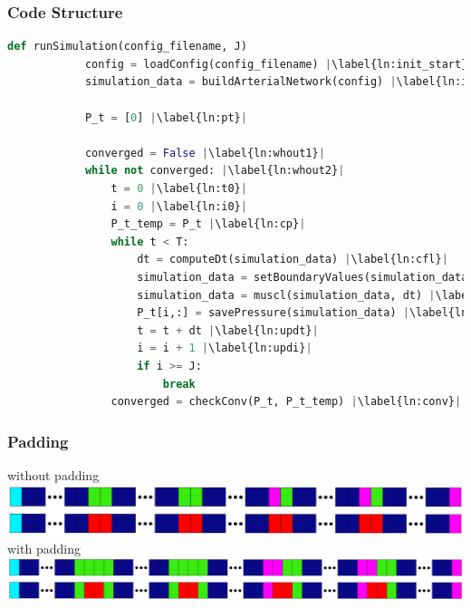 \documentclass{beamer}
\begin{document}
\begin{frame} [fragile]
	\frametitle{Code Structure}
	\begin{lstlisting}[basicstyle=\fontsize{8}{8}\selectfont\ttfamily, language=Python, caption=The code structure of an entire simulation is given here in pseudocode. Each line is detailed throughout this section., label=lst:pc, escapechar=|] 
		def runSimulation(config_filename, J) 
			config = loadConfig(config_filename) |\label{ln:init_start}|
			simulation_data = buildArterialNetwork(config) |\label{ln:init_end}|

			P_t = [0] |\label{ln:pt}|

			converged = False |\label{ln:whout1}|
			while not converged: |\label{ln:whout2}|
				t = 0 |\label{ln:t0}|
				i = 0 |\label{ln:i0}|
				P_t_temp = P_t |\label{ln:cp}|
				while t < T:
					dt = computeDt(simulation_data) |\label{ln:cfl}|
					simulation_data = setBoundaryValues(simulation_data, dt) |\label{ln:bv    }|
					simulation_data = muscl(simulation_data, dt) |\label{ln:muscl}|
					P_t[i,:] = savePressure(simulation_data) |\label{ln:svp}|
					t = t + dt |\label{ln:updt}|
					i = i + 1 |\label{ln:updi}|
					if i >= J:
						break
				converged = checkConv(P_t, P_t_temp) |\label{ln:conv}|
	\end{lstlisting}
\end{frame}
\begin{frame}
	\frametitle{Padding}
	without padding
	\includegraphics[width=\textwidth]{images/padding1.eps}
	with padding
	\includegraphics[width=\textwidth]{images/padding2.eps}
\end{frame}
\end{document}
